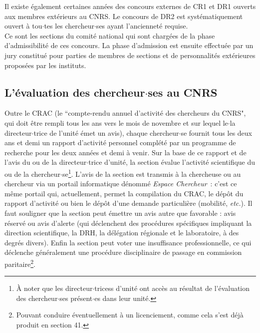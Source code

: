 Il existe \'egalement certaines ann\'ees des concours externes de CR1 et DR1 ouverts aux membres ext\'erieurs au CNRS.
Le concours de DR2 est syst\'ematiquement ouvert \`a tou$\cdot$tes les chercheur$\cdot$ses ayant l'anciennet\'e requise.\\

Ce sont les sections du comit\'e national qui sont charg\'ees de la phase  d'admissibilit\'e de ces concours.
La phase d'admission est ensuite effectu\'ee par un jury constitu\'e pour parties de membres de sections et de personnalit\'es ext\'erieures propos\'ees par les instituts. 

\subsection{L'\'evaluation des chercheur$\cdot$ses au CNRS}
\label{sec. evalcnrs}

Outre le CRAC (le ``compte-rendu annuel d'activit\'e des
chercheurs du CNRS", qui doit \^etre rempli tous les ans vers le mois de novembre
et sur lequel le$\cdot$la directeur$\cdot$trice de l'unit\'e \'emet un avis),
chaque chercheur$\cdot$se fournit tous les deux ans  et demi un rapport d'activit\'e personnel compl\'et\'e
par un programme de recherche pour les deux ann\'ees et demi \`a venir.
Sur la base de ce rapport et de l'avis du ou de la directeur$\cdot$trice d'unit\'e, la section \'evalue l'activit\'e scientifique du ou de la
chercheur$\cdot$se\footnote{\`A noter que les directeur$\cdot$tricess d'unit\'e ont acc\`es au
r\'esultat de l'\'evaluation des chercheur$\cdot$ses pr\'esent$\cdot$es dans leur
unit\'e.}.
L'avis de la section est transmis \`a la chercheuse ou au chercheur
{via} un portail informatique d\'enomm\'e \emph{Espace
Chercheur}~: c'est ce m\^eme portail qui, actuellement, permet la
compilation du CRAC, le d\'ep\^{o}t du rapport d'activit\'e ou
bien le d\'ep\^{o}t d'une demande particuli\`ere (mobilit\'e,
{\em etc.}). Il faut souligner que la section peut \'emettre un avis autre que favorable :
avis r\'eserv\'e ou avis d'alerte (qui d\'eclenchent des proc\'edures sp\'ecifiques impliquant la direction scientifique,
la DRH, la d\'el\'egation r\'egionale et le laboratoire, \`a des degr\'es divers). Enfin la section peut voter
une insuffisance professionnelle, ce qui d\'eclenche g\'en\'eralement une proc\'edure disciplinaire de passage en commission
paritaire\footnote{Pouvant conduire \'eventuellement \`a un licenciement, comme cela s'est d\'ej\`a produit en section 41.}.
\\

